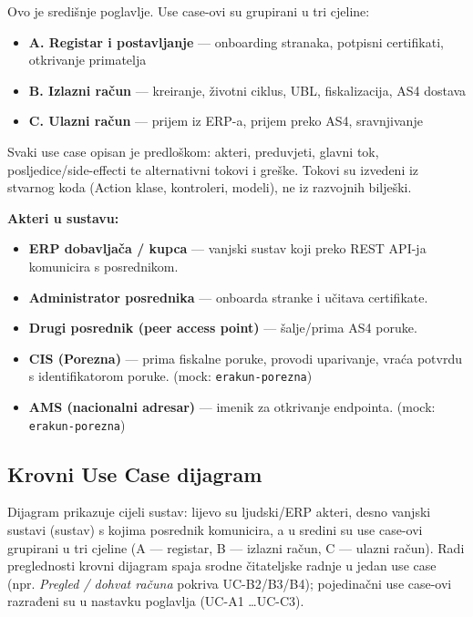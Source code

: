 \documentclass[11pt,a4paper]{article}
\begin{document}
Ovo je središnje poglavlje. Use case-ovi su grupirani u tri cjeline:

\begin{itemize}[nosep]
  \item \textbf{A. Registar i postavljanje} — onboarding stranaka, potpisni certifikati, otkrivanje primatelja
  \item \textbf{B. Izlazni račun} — kreiranje, životni ciklus, UBL, fiskalizacija, AS4 dostava
  \item \textbf{C. Ulazni račun} — prijem iz ERP-a, prijem preko AS4, sravnjivanje
\end{itemize}

Svaki use case opisan je predloškom: akteri, preduvjeti, glavni tok, posljedice/side-effecti te
alternativni tokovi i greške. Tokovi su izvedeni iz stvarnog koda (Action klase, kontroleri,
modeli), ne iz razvojnih bilješki.

\textbf{Akteri u sustavu:}
\begin{itemize}[nosep]
  \item \textbf{ERP dobavljača / kupca} — vanjski sustav koji preko REST API-ja komunicira s posrednikom.
  \item \textbf{Administrator posrednika} — onboarda stranke i učitava certifikate.
  \item \textbf{Drugi posrednik (peer access point)} — šalje/prima AS4 poruke.
  \item \textbf{CIS (Porezna)} — prima fiskalne poruke, provodi uparivanje, vraća potvrdu s identifikatorom poruke. (mock: \texttt{erakun-porezna})
  \item \textbf{AMS (nacionalni adresar)} — imenik za otkrivanje endpointa. (mock: \texttt{erakun-porezna})
\end{itemize}

\subsection{Krovni Use Case dijagram}

Dijagram prikazuje cijeli sustav: lijevo su ljudski/ERP akteri, desno vanjski
sustavi (\guillemotleft sustav\guillemotright) s kojima posrednik komunicira, a u sredini su
use case-ovi grupirani u tri cjeline (A — registar, B — izlazni račun, C — ulazni račun). Radi
preglednosti krovni dijagram spaja srodne čitateljske radnje u jedan use case
(npr. \emph{Pregled / dohvat računa} pokriva UC-B2/B3/B4); pojedinačni use case-ovi razrađeni
su u nastavku poglavlja (UC-A1 \dots UC-C3).
\end{document}
